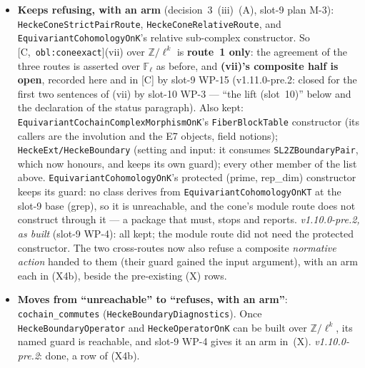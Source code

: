 \documentclass[11pt]{article}
\theoremstyle{remark}
\newcommand{\F}{\mathbb{F}}
\newcommand{\Z}{\mathbb{Z}}
\newcommand{\Fl}{\F_\ell}
\newcommand{\HA}[1]{[C,~\texttt{#1}]}      %
\begin{document}
\begin{enumerate}[label=(b\arabic*)]
\begin{itemize}
    \texttt{uint32\_t} bulk object cannot exist there either. At $\ell=5$ the cone's reductions to
    $\Fl$ run (the $\Fl$ cone class being \texttt{uint32\_t}); at the two word-regime cells they do
    not, and the dense route, the boundary, both Hecke actions and the boundary reductions do.
    \texttt{SL2ZBoundaryPair} builds the circle model over the ring with a new generator,
    \texttt{GenerateSL2ZBoundaryRelationsRing}, under the default \texttt{SmallEllPolicy}. Tests:
    \texttt{HeckeReductionValidation} arms (4b-B), (4b-C), (4b-H), (4b-R), (4b-K) and (X4b).
  \item \textbf{Keeps refusing, with an arm} (decision~3~(iii)~(A), slot-9 plan M-3):
    \texttt{HeckeConeStrictPairRoute}, \texttt{HeckeConeRelativeRoute}, and
    \texttt{EquivariantCohomologyOnK}'s relative sub-complex constructor. So
    \HA{obl:coneexact}(vii) over $\Z/\ell^k$ is \textbf{route~1 only}: the agreement of the three
    routes is asserted over $\Fl$ as before, and \textbf{(vii)'s composite half is open}, recorded
    here and in [C] by slot-9 WP-15 (v1.11.0-pre.2: closed for the first two sentences of (vii) by
    slot-10 WP-3 --- ``the lift (slot~10)'' below and the declaration of the status paragraph). Also kept: \texttt{EquivariantCochainComplexMorphismOnK}'s
    \texttt{FiberBlockTable} constructor (its callers are the involution and the E7 objects, field
    notions); \texttt{HeckeExt/HeckeBoundary} (setting and input: it consumes
    \texttt{SL2ZBoundaryPair}, which now honours, and keeps its own guard); every other
    member of the list above. \texttt{EquivariantCohomologyOnK}'s protected (prime, rep\_dim)
    constructor keeps its guard: no class derives from \texttt{EquivariantCohomologyOnKT} at the
    slot-9 base (grep), so it is unreachable, and the cone's module route does not construct through
    it --- a package that must, stops and reports. \emph{v1.10.0-pre.2, as built} (slot-9 WP-4):
    all kept; the module route did not need the protected constructor. The two cross-routes
    now also refuse a composite \emph{normative action} handed to them (their guard gained the
    input argument), with an arm each in (X4b), beside the pre-existing (X) rows.
  \item \textbf{Moves from ``unreachable'' to ``refuses, with an arm''}: \texttt{cochain\_commutes}
    (\texttt{HeckeBoundaryDiagnostics}). Once \texttt{HeckeBoundaryOperator} and
    \texttt{HeckeOperatorOnK} can be built over $\Z/\ell^k$, its named guard is reachable, and
    slot-9 WP-4 gives it an arm in~(X). \emph{v1.10.0-pre.2}: done, a row of (X4b).

\end{itemize}
\end{enumerate}
\end{document}
